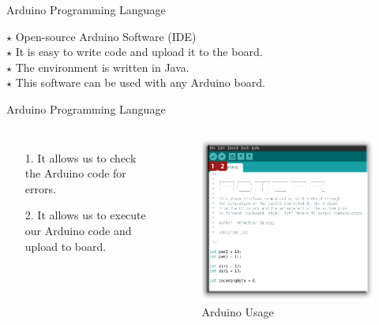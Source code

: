 \documentclass[xcolor=table, 9pt]{beamer}
\begin{document}
	



\begin{frame}{Arduino Programming Language}
\begin{block}{}
$\star$ Open-source Arduino Software (IDE)\\
\vspace{0.2cm}
$\star$ It is easy to write code and upload it to the board.\\
\vspace{0.2cm}
$\star$ The environment is written in Java.\\
\vspace{0.2cm}
$\star$ This software can be used with any Arduino board.
\end{block}
\end{frame}

\begin{frame}{Arduino Programming Language}
\begin{columns}[c] 
\begin{itemize}
\item[1.] It allows us to check the Arduino code for errors.
\item[2.] It allows us to execute our Arduino code and upload to board.
\end{itemize}
\begin{figure}
\includegraphics[width=1\linewidth]{update_execute.png}
\caption{Arduino Usage}
\end{figure}
\end{columns}
\end{frame}
\end{document}
